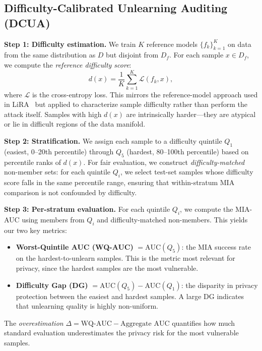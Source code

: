 \documentclass{article}
\newcommand{\wqauc}{\text{WQ-AUC}}
\begin{document}
\subsection{Difficulty-Calibrated Unlearning Auditing (DCUA)}

\textbf{Step 1: Difficulty estimation.}
We train $K$ reference models $\{f_k\}_{k=1}^K$ on data from the same distribution as $D$ but disjoint from $D_f$.
For each sample $x \in D_f$, we compute the \emph{reference difficulty score}:
\begin{equation}
    d(x) = \frac{1}{K} \sum_{k=1}^{K} \mathcal{L}(f_k, x),
\end{equation}
where $\mathcal{L}$ is the cross-entropy loss.
This mirrors the reference-model approach used in LiRA~\citep{carlini2022membership} but applied to characterize sample difficulty rather than perform the attack itself.
Samples with high $d(x)$ are intrinsically harder---they are atypical or lie in difficult regions of the data manifold.

\textbf{Step 2: Stratification.}
We assign each sample to a difficulty quintile $Q_1$ (easiest, 0--20th percentile) through $Q_5$ (hardest, 80--100th percentile) based on percentile ranks of $d(x)$.
For fair evaluation, we construct \emph{difficulty-matched} non-member sets: for each quintile $Q_i$, we select test-set samples whose difficulty score falls in the same percentile range, ensuring that within-stratum MIA comparison is not confounded by difficulty.

\textbf{Step 3: Per-stratum evaluation.}
For each quintile $Q_i$, we compute the MIA-AUC using members from $Q_i$ and difficulty-matched non-members.
This yields our two key metrics:
\begin{itemize}
    \item \textbf{Worst-Quintile AUC (WQ-AUC)} $= \text{AUC}(Q_5)$: the MIA success rate on the hardest-to-unlearn samples. This is the metric most relevant for privacy, since the hardest samples are the most vulnerable.
    \item \textbf{Difficulty Gap (DG)} $= \text{AUC}(Q_5) - \text{AUC}(Q_1)$: the disparity in privacy protection between the easiest and hardest samples. A large DG indicates that unlearning quality is highly non-uniform.
\end{itemize}

The \emph{overestimation} $\Delta = \wqauc - \text{Aggregate AUC}$ quantifies how much standard evaluation underestimates the privacy risk for the most vulnerable samples.
\end{document}
